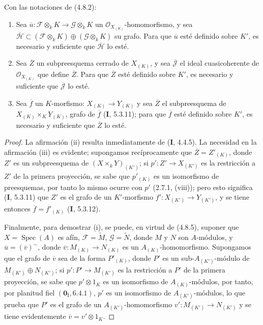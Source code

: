 \begin{lemma}[4.8.8]
\label{IV.2.4.8.8-fr}
Con las notaciones de \textup{(4.8.2)}:
\begin{enumerate}
\item[\textup{(i)}] Sea
$\overline u:\mathscr F\otimes_kK\to\mathscr G\otimes_kK$ un
$\mathcal O_{X_{(K)}}$-homomorfismo, y sea
$\overline{\mathscr H}\subset
(\mathscr F\otimes_kK)\oplus(\mathscr G\otimes_kK)$ su grafo. Para que
$\overline u$ esté definido sobre $K'$, es necesario y suficiente que
$\overline{\mathscr H}$ lo esté.
\item[\textup{(ii)}] Sea $\overline Z$ un subpreesquema cerrado de $X_{(K)}$, y sea
$\overline{\mathscr J}$ el ideal cuasicoherente de $\mathcal O_{X_{(K)}}$
que define $\overline Z$. Para que $\overline Z$ esté definido sobre $K'$, es
necesario y suficiente que $\overline{\mathscr J}$ lo esté.
\item[\textup{(iii)}] Sea $\overline f$ un $K$-morfismo:
$X_{(K)}\to Y_{(K)}$ y sea $\overline Z$ el subpreesquema de
$X_{(K)}\times_KY_{(K)}$, grafo de $\overline f$ \textup{(\textbf I, 5.3.11)}; para que
$\overline f$ esté definido sobre $K'$, es necesario y suficiente que $\overline Z$ lo
esté.
\end{enumerate}
\end{lemma}

\begin{proof}
La afirmación (ii) resulta inmediatamente de (\textbf I, 4.4.5). La necesidad en la
afirmación (iii) es evidente; supongamos recíprocamente que
$\overline Z=Z'_{(K)}$, donde $Z'$ es un subpreesquema de
$(X\times_kY)_{(K')}$; si $p':Z'\to X_{(K')}$ es la restricción a $Z'$ de la
primera proyección, se sabe que $p'_{(K)}$ es un isomorfismo de preesquemas,
por tanto lo mismo ocurre con $p'$ (2.7.1, (viii)); pero esto significa (\textbf I, 5.3.11)
que $Z'$ es el grafo de un $K'$-morfismo
$f':X_{(K')}\to Y_{(K')}$, y se tiene entonces
$\overline f=f'_{(K)}$ (\textbf I, 5.3.12).

Finalmente, para demostrar (i), se puede, en virtud de (4.8.5), suponer que
$X=\operatorname{Spec}(A)$ es afín, $\mathscr F=\widetilde M$,
$\mathscr G=\widetilde N$, donde $M$ y $N$ son $A$-módulos, y
$\overline u=(\overline v)^{\sim}$, donde
$\overline v:M_{(K)}\to N_{(K)}$ es un $A_{(K)}$-homomorfismo. Supongamos
que el grafo de $\overline v$ sea de la forma $P'_{(K)}$, donde $P'$ es un
sub-$A_{(K')}$-módulo de $M_{(K')}\oplus N_{(K')}$; si
$p':P'\to M_{(K')}$ es la restricción a $P'$ de la primera proyección,
se sabe que $p'\otimes1_K$ es un isomorfismo de $A_{(K)}$-módulos, por tanto,
por planitud fiel $(\mathbf{0}_{\mathrm I},6.4.1)$, $p'$ es un isomorfismo de
$A_{(K')}$-módulos, lo que prueba que $P'$ es el grafo de un
$A_{(K')}$-homomorfismo $v':M_{(K')}\to N_{(K')}$ y se tiene evidentemente
$\overline v=v'\otimes1_K$.
\end{proof}

